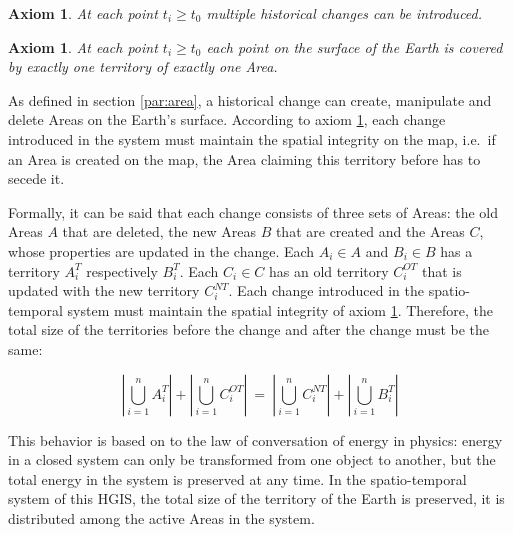 \vspace{-2.0em}
\newtheorem{historical_change}[assicounter]{Axiom}
\begin{historical_change}
\label{axm:historical_change}
  At each point $t_i \geq t_0$ multiple historical changes can be introduced.
\end{historical_change}

\vspace{-2.0em}
\newtheorem{unique_coverage}[assicounter]{Axiom}
\begin{unique_coverage}
\label{axm:unique_coverage}
  At each point $t_i \geq t_0$ each point on the surface of the Earth is covered by exactly one territory of exactly one Area.
\end{unique_coverage}

As defined in section \ref{par:area}, a historical change can create, manipulate and delete Areas on the Earth's surface. According to axiom \ref{axm:unique_coverage}, each change introduced in the system must maintain the spatial integrity on the map, i.e.\ if an Area is created on the map, the Area claiming this territory before has to secede it.

Formally, it can be said that each change consists of three sets of Areas: the old Areas $A$ that are deleted, the new Areas $B$ that are created and the Areas $C$, whose properties are updated in the change. Each $A_i \in A$ and $B_i \in B$ has a territory $A_i^T$ respectively $B_i^T$. Each $C_i \in C$ has an old territory $C_i^{OT}$ that is updated with the new territory $C_i^{NT}$. Each change introduced in the spatio-temporal system must maintain the spatial integrity of axiom \ref{axm:unique_coverage}. Therefore, the total size of the territories before the change and after the change must be the same:

\vspace{-.5em}

\[
  \left|\bigcup\limits_{i=1}^n A_i^T\right|
  +
  \left|\bigcup\limits_{i=1}^n C_i^{OT}\right|
  ~=~
  \left|\bigcup\limits_{i=1}^n C_i^{NT}\right|
  +
  \left|\bigcup\limits_{i=1}^n B_i^T\right|
\]

\vspace{.5em}

This behavior is based on to the law of conversation of energy in physics: energy in a closed system can only be transformed from one object to another, but the total energy in the system is preserved at any time. In the spatio-temporal system of this HGIS, the total size of the territory of the Earth is preserved, it is distributed among the active Areas in the system.

